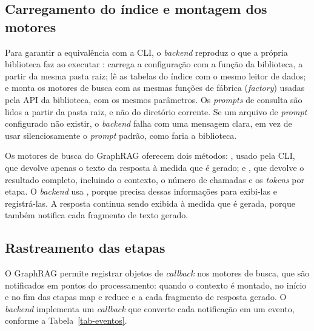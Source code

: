 \subsection{Carregamento do índice e montagem dos motores}
\label{sec-aplicacao-backend-carga}

Para garantir a equivalência com a CLI, o \textit{backend} reproduz o que a própria biblioteca faz ao executar : carrega a configuração com a função da biblioteca, a partir da mesma pasta raiz; lê as tabelas do índice com o mesmo leitor de dados; e monta os motores de busca com as mesmas funções de fábrica (\textit{factory}) usadas pela API da biblioteca, com os mesmos parâmetros. Os \textit{prompts} de consulta são lidos a partir da pasta raiz, e não do diretório corrente. Se um arquivo de \textit{prompt} configurado não existir, o \textit{backend} falha com uma mensagem clara, em vez de usar silenciosamente o \textit{prompt} padrão, como faria a biblioteca.

Os motores de busca do GraphRAG oferecem dois métodos: , usado pela CLI, que devolve apenas o texto da resposta à medida que é gerado; e , que devolve o resultado completo, incluindo o contexto, o número de chamadas e os \textit{tokens} por etapa. O \textit{backend} usa , porque precisa dessas informações para exibi-las e registrá-las. A resposta continua sendo exibida à medida que é gerada, porque  também notifica cada fragmento de texto gerado.

\subsection{Rastreamento das etapas}
\label{sec-aplicacao-backend-etapas}

O GraphRAG permite registrar objetos de \textit{callback} nos motores de busca, que são notificados em pontos do processamento: quando o contexto é montado, no início e no fim das etapas map e reduce e a cada fragmento de resposta gerado. O \textit{backend} implementa um \textit{callback} que converte cada notificação em um evento, conforme a Tabela~\ref{tab-eventos}.

